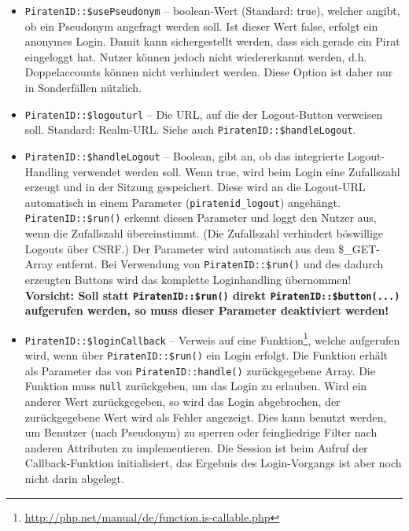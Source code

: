 \begin{itemize}
	\item \texttt{PiratenID::\$usePseudonym} -- boolean-Wert (Standard: true), welcher angibt, ob ein Pseudonym angefragt werden soll.
											Ist dieser Wert false, erfolgt ein anonymes Login.
											Damit kann sichergestellt werden, dass sich gerade ein Pirat eingeloggt hat.
											Nutzer können jedoch nicht wiedererkannt werden, d.h. Doppelaccounts können nicht verhindert werden.
											Diese Option ist daher nur in Sonderfällen nützlich.
	
	\item \texttt{PiratenID::\$logouturl} -- Die URL, auf die der Logout-Button verweisen soll. Standard: Realm-URL.
											Siehe auch \texttt{PiratenID::\$handleLogout}.

	\item \texttt{PiratenID::\$handleLogout} -- Boolean, gibt an, ob das integrierte Logout-Handling verwendet werden soll.
											Wenn true, wird beim Login eine Zufallszahl erzeugt und in der Sitzung gespeichert.
											Diese wird an die Logout-URL automatisch in einem Parameter (\texttt{piratenid\_logout}) angehängt.
											\texttt{PiratenID::\$run()} erkennt diesen Parameter und loggt den Nutzer aus,
											wenn die Zufallszahl übereinstimmt. (Die Zufallszahl verhindert böswillige Logouts über CSRF.)
											Der Parameter wird automatisch aus dem \$\_GET-Array entfernt.
											Bei Verwendung von \texttt{PiratenID::\$run()} und des dadurch erzeugten Buttons
											wird das komplette Loginhandling übernommen!
											\\\textbf{Vorsicht:
												Soll statt \texttt{PiratenID::\$run()} direkt \texttt{PiratenID::\$button(...)} aufgerufen werden,
												so muss dieser Parameter deaktiviert werden! }
												
	\item \texttt{PiratenID::\$loginCallback} -- Verweis auf eine Funktion\footnote{\url{http://php.net/manual/de/function.is-callable.php}},
											welche aufgerufen wird, wenn über \texttt{PiratenID::\$run()} ein Login erfolgt.
											Die Funktion erhält als Parameter das von \texttt{PiratenID::handle()} zurückgegebene Array.
											Die Funktion muss \texttt{null} zurückgeben, um das Login zu erlauben.
											Wird ein anderer Wert zurückgegeben, so wird das Login abgebrochen,
											der zurückgegebene Wert wird als Fehler angezeigt.
											Dies kann benutzt werden, um Benutzer (nach Pseudonym) zu sperren oder
											feingliedrige Filter nach anderen Attributen zu implementieren.
											Die Session ist beim Aufruf der Callback-Funktion initialisiert,
											das Ergebnis des Login-Vorgangs ist aber noch nicht darin abgelegt.
	

\end{itemize}
